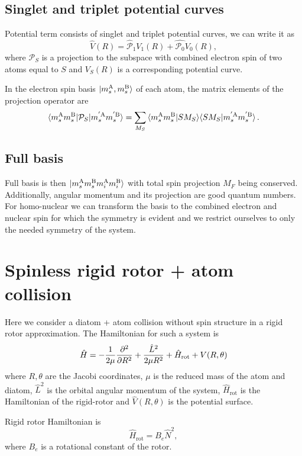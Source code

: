 \documentclass[a4paper]{article}
\begin{document}
\subsection{Singlet and triplet potential curves}
    Potential term consists of singlet and triplet potential curves, we can write it as
    \[
        \hat{V}(R) = \hat{\mathcal{P}}_1 V_1(R) + \hat{\mathcal{P}_0} V_0(R),
    \]
    where \(\mathcal{P}_S\) is a projection to the subspace with combined electron spin of two atoms equal to $S$
    and \(V_S(R)\) is a corresponding potential curve.

    In the electron spin basis \(\ket{m_s^\text{A}, m_s^\text{B}}\) of each atom,
    the matrix elements of the projection operator are
    \[
        \braket{m_s^\text{A} m_s^\text{B} | \mathcal{P}_S | m_s^{'\text{A}} m_s^{'\text{B}}}
            = \sum_{M_S} \braket{m_s^\text{A} m_s^\text{B} | S M_S}\!\braket{S M_S| m_s^{'\text{A}} m_s^{'\text{B}}}.
    \]

\subsection{Full basis}
    Full basis is then \(\ket{m_s^\text{A} m_s^\text{B} m_i^\text{A} m_i^\text{B}}\) with total spin projection \(M_F\) being conserved.
    Additionally, angular momentum and its projection are good quantum numbers.
    For homo-nuclear we can transform the basis to the combined electron and nuclear spin for which the symmetry is evident
    and we restrict ourselves to only the needed symmetry of the system.

\section{Spinless rigid rotor + atom collision}
    Here we consider a diatom + atom collision without spin structure in a rigid rotor approximation.
    The Hamiltonian for such a system is
    \[
        \hat{H} = -\frac{1}{2\mu}\pdv[order=2]{}{R} + \frac{\hat{L}^2}{2\mu R^2} + \hat{H}_\text{rot} + V(R, \theta)
    \]
    where $R, \theta$ are the Jacobi coordinates, $\mu$ is the reduced mass of the atom and diatom, 
    \(\hat{L}^2\) is the orbital angular momentum of the system,
    \(\hat{H}_\text{rot}\) is the Hamiltonian of the rigid-rotor and \(\hat{V}(R, \theta)\) 
    is the potential surface.

    Rigid rotor Hamiltonian is
    \[
        \hat{H}_\text{rot} = B_e \hat{N}^2,
    \]
    where \(B_e\) is a rotational constant of the rotor.
\end{document}
